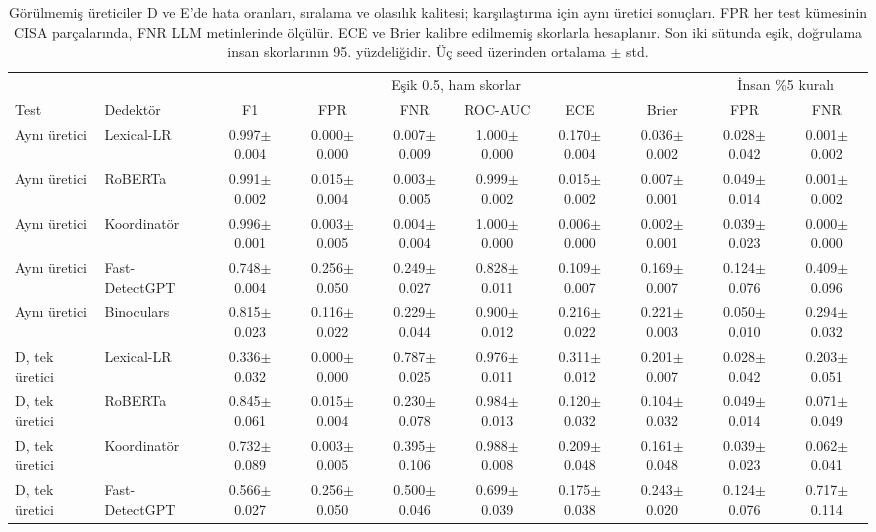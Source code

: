 \begin{table}[t]
\centering
\scriptsize\setlength{\tabcolsep}{2.5pt}
\caption{Görülmemiş üreticiler D ve E'de hata oranları, sıralama ve olasılık kalitesi; karşılaştırma için aynı üretici sonuçları. FPR her test kümesinin CISA parçalarında, FNR LLM metinlerinde ölçülür. ECE ve Brier kalibre edilmemiş skorlarla hesaplanır. Son iki sütunda eşik, doğrulama insan skorlarının 95. yüzdeliğidir. Üç seed üzerinden ortalama $\pm$ std.}
\label{tab:newgen}
\begin{tabular}{@{}llcccccccc@{}}
\toprule
 & & \multicolumn{6}{c}{Eşik 0.5, ham skorlar} & \multicolumn{2}{c}{İnsan \%5 kuralı} \\
\cmidrule(lr){3-8}\cmidrule(lr){9-10}
Test & Dedektör & F1 & FPR & FNR & ROC-AUC & ECE & Brier & FPR & FNR \\
\midrule
Aynı üretici & Lexical-LR & 0.997$\pm$0.004 & 0.000$\pm$0.000 & 0.007$\pm$0.009 & 1.000$\pm$0.000 & 0.170$\pm$0.004 & 0.036$\pm$0.002 & 0.028$\pm$0.042 & 0.001$\pm$0.002 \\
Aynı üretici & RoBERTa & 0.991$\pm$0.002 & 0.015$\pm$0.004 & 0.003$\pm$0.005 & 0.999$\pm$0.002 & 0.015$\pm$0.002 & 0.007$\pm$0.001 & 0.049$\pm$0.014 & 0.001$\pm$0.002 \\
Aynı üretici & Koordinatör & 0.996$\pm$0.001 & 0.003$\pm$0.005 & 0.004$\pm$0.004 & 1.000$\pm$0.000 & 0.006$\pm$0.000 & 0.002$\pm$0.001 & 0.039$\pm$0.023 & 0.000$\pm$0.000 \\
Aynı üretici & Fast-DetectGPT & 0.748$\pm$0.004 & 0.256$\pm$0.050 & 0.249$\pm$0.027 & 0.828$\pm$0.011 & 0.109$\pm$0.007 & 0.169$\pm$0.007 & 0.124$\pm$0.076 & 0.409$\pm$0.096 \\
Aynı üretici & Binoculars & 0.815$\pm$0.023 & 0.116$\pm$0.022 & 0.229$\pm$0.044 & 0.900$\pm$0.012 & 0.216$\pm$0.022 & 0.221$\pm$0.003 & 0.050$\pm$0.010 & 0.294$\pm$0.032 \\
D, tek üretici & Lexical-LR & 0.336$\pm$0.032 & 0.000$\pm$0.000 & 0.787$\pm$0.025 & 0.976$\pm$0.011 & 0.311$\pm$0.012 & 0.201$\pm$0.007 & 0.028$\pm$0.042 & 0.203$\pm$0.051 \\
D, tek üretici & RoBERTa & 0.845$\pm$0.061 & 0.015$\pm$0.004 & 0.230$\pm$0.078 & 0.984$\pm$0.013 & 0.120$\pm$0.032 & 0.104$\pm$0.032 & 0.049$\pm$0.014 & 0.071$\pm$0.049 \\
D, tek üretici & Koordinatör & 0.732$\pm$0.089 & 0.003$\pm$0.005 & 0.395$\pm$0.106 & 0.988$\pm$0.008 & 0.209$\pm$0.048 & 0.161$\pm$0.048 & 0.039$\pm$0.023 & 0.062$\pm$0.041 \\
D, tek üretici & Fast-DetectGPT & 0.566$\pm$0.027 & 0.256$\pm$0.050 & 0.500$\pm$0.046 & 0.699$\pm$0.039 & 0.175$\pm$0.038 & 0.243$\pm$0.020 & 0.124$\pm$0.076 & 0.717$\pm$0.114 \\

\end{tabular}
\end{table}
